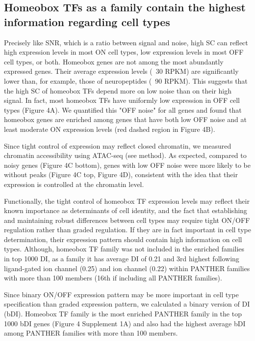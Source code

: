 \subsection{Homeobox TFs as a family contain the highest information regarding cell types}

Precisely like SNR, which is a ratio between signal and noise, high SC can reflect high expression levels in most ON cell types, low expression levels in most OFF cell types, or both. Homeobox genes are not among the most abundantly expressed genes. Their average expression levels (~30 RPKM) are significantly lower than, for example, those of neuropeptides (~90 RPKM). This suggests that the high SC of homeobox TFs depend more on low noise than on their high signal. In fact, most  homeobox TFs have uniformly low expression in OFF cell types (Figure 4A). We quantified this "OFF noise" for all genes and found that homeobox genes are enriched among genes that have both low OFF noise and at least moderate ON expression levels (red dashed region in Figure 4B).

Since tight control of expression may reflect closed chromatin, we measured chromatin accessibility using ATAC-seq (see method). As expected, compared to noisy genes (Figure 4C bottom), genes with low OFF noise were more likely to be without peaks (Figure 4C top, Figure 4D), consistent with the idea that their expression is controlled at the chromatin level.

Functionally, the tight control of homeobox TF expression levels may reflect their known importance as determinants of cell identity, and the fact that establishing and maintaining robust differences between cell types may require tight ON/OFF regulation rather than graded regulation. If they are in fact important in cell type determination, their expression pattern should contain high information on cell types. Although, homeobox TF family was not included in the enriched families in top 1000 DI, as a family it has average DI of 0.21 and 3rd highest following ligand-gated ion channel (0.25) and ion channel (0.22) within PANTHER families with more than 100 members (16th if including all PANTHER families).  

Since binary ON/OFF expression pattern may be more important in cell type specification than graded expression pattern, we calculated a binary version of DI (bDI). Homeobox TF family is the most enriched PANTHER family in the top 1000 bDI genes (Figure 4 Supplement 1A) and also had the highest average bDI among PANTHER families with more than 100 members. 

